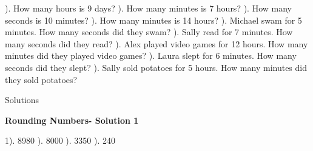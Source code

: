 \documentclass{article}%
\begin{document}
). How many hours is 9 days?%
\newline%
\newline%
). How many minutes is 7 hours?%
\newline%
\newline%
). How many seconds is 10 minutes?%
\newline%
\newline%
). How many minutes is 14 hours?%
\newline%
\newline%
). Michael swam for 5 minutes. How many seconds did they swam?%
\newline%
\newline%
). Sally read for 7 minutes. How many seconds did they read?%
\newline%
\newline%
). Alex played video games for 12 hours. How many minutes did they played video games?%
\newline%
\newline%
). Laura slept for 6 minutes. How many seconds did they slept?%
\newline%
\newline%
). Sally sold potatoes for 5 hours. How many minutes did they sold potatoes?%
\newline%
\newline%
\newline%
\pagebreak%
\huge%
\vspace*{\fill}%
\begin{center}%
Solutions%
\end{center}%
\vspace*{\fill}%
\normalsize%
\pagebreak%
\large%
\begin{center}%
\textbf{Rounding Numbers- Solution 1}%
\newline%
\end{center} \normalsize%
1). 8980%
). 8000%
). 3350%
). 240%
\newline%
\end{document}
